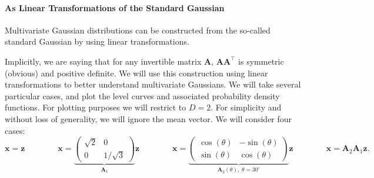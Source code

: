 
\paragraph{As Linear Transformations of the Standard Gaussian} Multivariate Gaussian distributions can be constructed from the so-called standard Gaussian by using linear transformations.\vspace{2mm}

\vspace{2mm}


Implicitly, we are saying that for any invertible matrix $\mathbf{A}$, $\mathbf{A}\mathbf{A}^\top$ is symmetric (obvious) and positive definite. We will use this construction using linear transformations to better understand multivariate Gaussians. We will take several particular cases, and plot the level curves and associated probability density functions. For plotting purposes we will restrict to $D=2$. For simplicity and without loss of generality, we will ignore the mean vector. We will consider four cases:
\begin{equation}
\mathbf{x} = \mathbf{z} \qquad\qquad \mathbf{x} = \underbrace{\left(\begin{array}{cc}\sqrt{2} & 0\\0 & 1/\sqrt{3}\end{array}\right)}_{\mathbf{A}_1}\mathbf{z} \qquad\qquad \mathbf{x} = \underbrace{\left(\begin{array}{cc}\cos(\theta) & -\sin(\theta)\\\sin(\theta) & \cos(\theta)\end{array}\right)}_{\mathbf{A}_2(\theta),\; \theta=30^\circ}\mathbf{z} \qquad\qquad \mathbf{x} = \mathbf{A}_2\mathbf{A}_1\mathbf{z}.
\end{equation}

